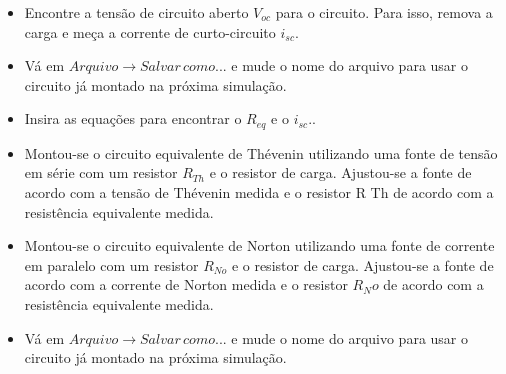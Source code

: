
\begin{itemize}
  \item Encontre a tensão de circuito aberto $V_{oc}$ para o circuito. Para isso, remova a carga e meça a corrente de curto-circuito $i_{sc}$.
\end{itemize}


\begin{itemize}

  \item Vá em $Arquivo\rightarrow Salvar \, como...$ e mude o nome do arquivo para usar o circuito já montado na próxima simulação.
\end{itemize}


\newpage

\begin{itemize}
  \item Insira as equações para encontrar o $R_{eq}$ e o $i_{sc}$..
\end{itemize}




\begin{itemize}
  \item Montou-se o circuito equivalente de Thévenin utilizando uma fonte de tensão em série com um resistor $R_{Th}$ e o resistor de carga. Ajustou-se a fonte de acordo com a tensão de Thévenin medida e o resistor R Th de acordo com a resistência equivalente medida.

  \item Montou-se o circuito equivalente de Norton utilizando uma fonte de corrente em paralelo com um resistor $R_{No}$ e o resistor de carga. Ajustou-se a fonte de acordo com a corrente de Norton medida e o resistor $R_No$ de acordo com a resistência equivalente medida.

  \item Vá em $Arquivo\rightarrow Salvar \, como...$ e mude o nome do arquivo para usar o circuito já montado na próxima simulação.
\end{itemize}


